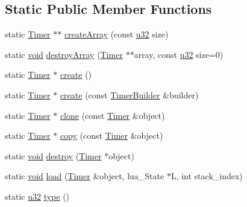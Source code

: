 \subsection*{Static Public Member Functions}
\begin{DoxyCompactItemize}
\item 
static \mbox{\hyperlink{classnjli_1_1_timer}{Timer}} $\ast$$\ast$ \mbox{\hyperlink{classnjli_1_1_timer_a81575fdeccaa12739eab0ed19d82af6a}{create\+Array}} (const \mbox{\hyperlink{_util_8h_a10e94b422ef0c20dcdec20d31a1f5049}{u32}} size)
\item 
static \mbox{\hyperlink{_thread_8h_af1e856da2e658414cb2456cb6f7ebc66}{void}} \mbox{\hyperlink{classnjli_1_1_timer_a22efffd5f7d3bd9789d6397fd2f30093}{destroy\+Array}} (\mbox{\hyperlink{classnjli_1_1_timer}{Timer}} $\ast$$\ast$array, const \mbox{\hyperlink{_util_8h_a10e94b422ef0c20dcdec20d31a1f5049}{u32}} size=0)
\item 
static \mbox{\hyperlink{classnjli_1_1_timer}{Timer}} $\ast$ \mbox{\hyperlink{classnjli_1_1_timer_afff5d216db54e7a2230efe06e940b036}{create}} ()
\item 
static \mbox{\hyperlink{classnjli_1_1_timer}{Timer}} $\ast$ \mbox{\hyperlink{classnjli_1_1_timer_a7034ba015773d310f422673a84b868fc}{create}} (const \mbox{\hyperlink{classnjli_1_1_timer_builder}{Timer\+Builder}} \&builder)
\item 
static \mbox{\hyperlink{classnjli_1_1_timer}{Timer}} $\ast$ \mbox{\hyperlink{classnjli_1_1_timer_a8e41dc40fb85189351121e8de88dd77d}{clone}} (const \mbox{\hyperlink{classnjli_1_1_timer}{Timer}} \&object)
\item 
static \mbox{\hyperlink{classnjli_1_1_timer}{Timer}} $\ast$ \mbox{\hyperlink{classnjli_1_1_timer_a3929a946ac20c6d0e68602bba1d66583}{copy}} (const \mbox{\hyperlink{classnjli_1_1_timer}{Timer}} \&object)
\item 
static \mbox{\hyperlink{_thread_8h_af1e856da2e658414cb2456cb6f7ebc66}{void}} \mbox{\hyperlink{classnjli_1_1_timer_a26931f44e8a19f4396743871d159db86}{destroy}} (\mbox{\hyperlink{classnjli_1_1_timer}{Timer}} $\ast$object)
\item 
static \mbox{\hyperlink{_thread_8h_af1e856da2e658414cb2456cb6f7ebc66}{void}} \mbox{\hyperlink{classnjli_1_1_timer_acad9695415047e980e802f6048aefe6d}{load}} (\mbox{\hyperlink{classnjli_1_1_timer}{Timer}} \&object, lua\+\_\+\+State $\ast$L, int stack\+\_\+index)
\item 
static \mbox{\hyperlink{_util_8h_a10e94b422ef0c20dcdec20d31a1f5049}{u32}} \mbox{\hyperlink{classnjli_1_1_timer_ad373f359bc83bdfe91103ecda0c6fad6}{type}} ()
\end{DoxyCompactItemize}
